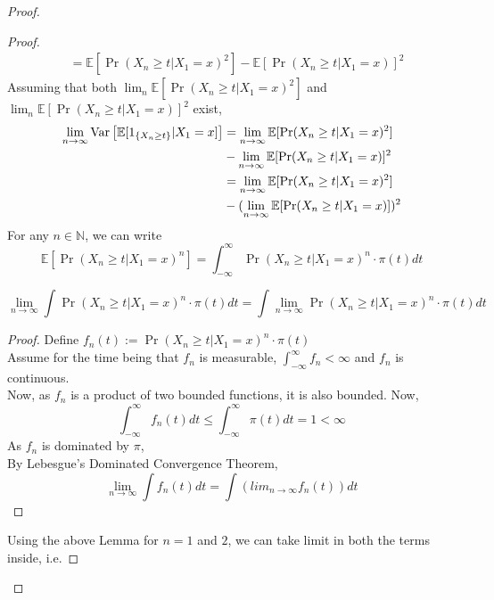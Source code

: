 \begin{theorem}
\begin{proof}
\begin{lem}
\begin{proof}
\begin{align*}
                    &= \mathbb{E}[\Pr(X_{n} \geq t | X_{1} = x)^2] - \mathbb{E}[\Pr(X_{n} \geq t | X_{1} = x)]^2
                \end{align*}
                Assuming that both $\lim_n \mathbb{E}[\Pr(X_{n} \geq t | X_{1} = x)^2]$ and  $\lim_n \mathbb{E}[\Pr(X_{n} \geq t | X_{1} = x)]^2$ exist,
                \begin{align*}
                    \lim_{n \rightarrow \infty} \text{Var}\left[{{\mathbb{E}[1_{\{X_{n} \geq t\}}|X_1=x]}}\right] &= \lim_{n \rightarrow \infty} \mathbb{E}[\Pr(X_{n} \geq t | X_{1} = x)^2]\\
                    &- \lim_{n \rightarrow \infty} \mathbb{E}[\Pr(X_{n} \geq t | X_{1} = x)]^2\\
                    &= \lim_{n \rightarrow \infty} \mathbb{E}[\Pr(X_{n} \geq t | X_{1} = x)^2]\\
                    &- (\lim_{n \rightarrow \infty} \mathbb{E}[\Pr(X_{n} \geq t | X_{1} = x)])^2\\
                \end{align*}
                For any $n \in \mathbb{N}$, we can write
                $$\mathbb{E}[\Pr(X_{n} \geq t | X_{1} = x)^n] = \int_{-\infty}^{\infty} \Pr(X_{n} \geq t | X_{1} = x)^n \cdot \pi(t)dt$$
                \begin{lem}
                    $$\lim_{n \rightarrow \infty} \int \Pr(X_{n} \geq t | X_{1} = x)^n \cdot \pi(t) dt = \int \lim_{n \rightarrow \infty}\Pr(X_{n} \geq t | X_{1} = x)^n \cdot \pi(t)dt$$
                    \begin{proof}
                        Define $f_n(t) := \Pr(X_{n} \geq t | X_{1} = x)^n \cdot \pi(t) $ \\
                        Assume for the time being that $f_n$ is measurable, $\int_{-\infty}^{\infty} f_n < \infty$ and $f_n$ is continuous.\\
                        Now, as $f_n$ is a product of two bounded functions, it is also bounded.
                        Now,
                        $$\int_{-\infty}^{\infty} f_n(t)dt \leq \int_{-\infty}^{\infty} \pi(t)dt = 1 < \infty$$
                        As $f_n$ is dominated by $\pi$, \\
                        By Lebesgue's Dominated Convergence Theorem,
                        $$\lim_{n \rightarrow \infty} \int f_n(t) dt = \int (lim_{n \rightarrow \infty} f_n(t)) dt$$
                    \end{proof}
                \end{lem}
                Using the above Lemma for $n = 1$ and $2$, we can take limit in both the terms inside, i.e.

\end{proof}
\end{lem}
\end{proof}
\end{theorem}
